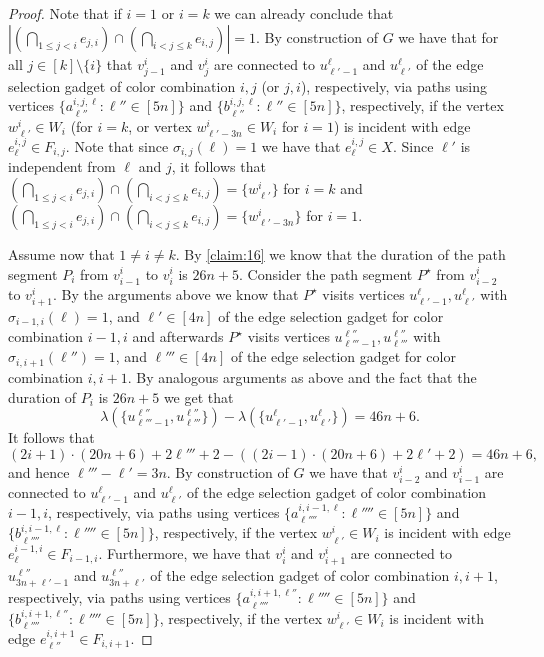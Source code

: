 \documentclass[a4paper,UKenglish,cleveref, autoref, thm-restate, anonymous]{lipics-v2021}
\begin{document}
\begin{proof}
Note that if $i=1$ or $i=k$ we can already conclude that $|(\bigcap_{1\le j<i} e_{j,i}) \cap (\bigcap_{i<j\le k} e_{i,j})|=1$. 
By construction of $G$ we have that for all $j\in[k]\setminus\{i\}$ that $v^i_{j-1}$ and $v^i_j$ are connected to $u^\ell_{\ell'-1}$ and $u^\ell_{\ell'}$ of the edge selection gadget of color combination $i,j$ (or $j,i$), respectively, via paths using vertices $\{a^{i,j,\ell}_{\ell''} :  \ell''\in[5n]\}$ and $\{b^{i,j,\ell}_{\ell''} :  \ell''\in[5n]\}$, respectively, if the vertex $w^i_{\ell'}\in W_i$ (for $i=k$, or vertex $w^i_{\ell'-3n}\in W_i$ for $i=1$) is incident with edge $e^{i,j}_\ell\in F_{i,j}$. Note that since $\sigma_{i,j}(\ell)=1$ we have that $e^{i,j}_\ell\in X$.
Since $\ell'$ is independent from $\ell$ and $j$, it follows that $(\bigcap_{1\le j<i} e_{j,i}) \cap (\bigcap_{i<j\le k} e_{i,j})=\{w^i_{\ell'}\}$ for $i=k$ and $(\bigcap_{1\le j<i} e_{j,i}) \cap (\bigcap_{i<j\le k} e_{i,j})=\{w^i_{\ell'-3n}\}$ for $i=1$.

Assume now that $1\neq i\neq k$. By \cref{claim:16} we know that the duration of the path segment $P_i$ from $v^i_{i-1}$ to $v^i_i$ is $26n+5$. Consider the path segment $P^\star$ from $v^i_{i-2}$ to $v^i_{i+1}$. By the arguments above we know that $P^\star$ visits vertices $u^\ell_{\ell'-1},u^\ell_{\ell'}$ with $\sigma_{i-1,i}(\ell)=1$, and $\ell'\in[4n]$ of the edge selection gadget for color combination $i-1,i$ and afterwards $P^\star$ visits vertices $u^{\ell''}_{\ell'''-1},u^{\ell''}_{\ell'''}$ with $\sigma_{i,i+1}(\ell'')=1$, and $\ell'''\in[4n]$ of the edge selection gadget for color combination $i,i+1$.
By analogous arguments as above and the fact that the duration of $P_i$ is $26n+5$ we get that 
\[
\lambda(\{u^{\ell''}_{\ell'''-1},u^{\ell''}_{\ell'''}\})-\lambda(\{u^\ell_{\ell'-1},u^\ell_{\ell'}\}) = 46n+6.
\]
It follows that 
\[
(2i+1)\cdot (20n+6)+2\ell'''+2 -((2i-1)\cdot (20n+6)+2\ell'+2) = 46n+6,
\]
and hence $\ell'''-\ell'=3n$.
By construction of $G$ we have that $v^i_{i-2}$ and $v^i_{i-1}$ are connected to $u^\ell_{\ell'-1}$ and $u^\ell_{\ell'}$ of the edge selection gadget of color combination $i-1,i$, respectively, via paths using vertices $\{a^{i,i-1,\ell}_{\ell''''} :  \ell''''\in[5n]\}$ and $\{b^{i,i-1,\ell}_{\ell''''} :  \ell''''\in[5n]\}$, respectively, if the vertex $w^i_{\ell'}\in W_i$ is incident with edge $e^{i-1,i}_\ell\in F_{i-1,i}$. 
Furthermore, we have that $v^i_{i}$ and $v^i_{i+1}$ are connected to $u^{\ell''}_{3n+\ell'-1}$ and $u^{\ell''}_{3n+\ell'}$ of the edge selection gadget of color combination $i,i+1$, respectively, via paths using vertices $\{a^{i,i+1,\ell''}_{\ell''''} :  \ell''''\in[5n]\}$ and $\{b^{i,i+1,\ell''}_{\ell''''} :  \ell''''\in[5n]\}$, respectively, if the vertex $w^i_{\ell'}\in W_i$ is incident with edge $e^{i,i+1}_{\ell''}\in F_{i,i+1}$. 


\end{proof}
\end{document}
